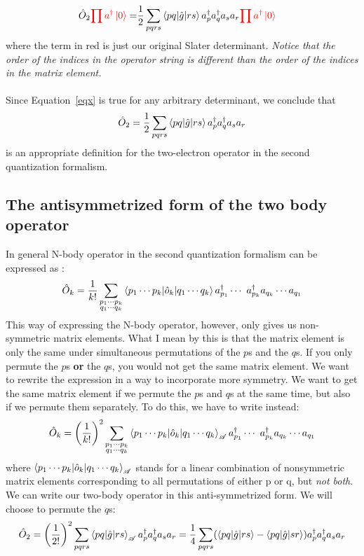 \documentclass{article}
\newcommand{\dg}{\ensuremath{^\dagger} }
\newcommand{\cd}{\ensuremath{\cdots} }
\begin{document}
\begin{align}
\hat{O}_2  {\color{red} \prod a\dg \ket{0} }= &\frac{1}{2}  \sum_{pqrs}  \braket{pq | \hat{g} | rs}  a\dg_{p}a\dg_{q} a_s a_r {\color{red} \prod a\dg \ket{0} } \label{eqx}
\end{align}
where the term in {\color{red} red} is just our original Slater determinant. \textit{Notice that the order of the indices in the operator string is different than the order of the indices in the matrix element. } \\ \\
Since Equation~\ref{eqx}  is true for any arbitrary determinant, we conclude that 
\begin{equation}
\hat{O}_2 =\frac{1}{2}  \sum_{pqrs}  \braket{pq | \hat{g} | rs}  a\dg_{p}a\dg_{q} a_s a_r
\end{equation}
is an appropriate definition for the two-electron operator in the second quantization formalism.
\\
\subsection{The antisymmetrized form of the two body operator}
In general N-body operator in the second quantization formalism can be expressed as :
\[ \hat{O}_k = \frac{1}{k!}   \sum_{\substack{p_1 \cd p_k \\q_1 \cd q_k }}  \braket{ p_1 \cd p_k | \hat{o}_k | q_1 \cd q_k} a_{p_1}\dg \cd \ a_{p_k}\dg a_{q_k} \cd a_{q_1} \]
This way of expressing the N-body operator, however, only gives us non-symmetric matrix elements. 
What I mean by this is that the matrix element is only the same under simultaneous permutations of the $p$s and the $q$s. 
If you only permute the $p$s \textbf{or} the $q$s, you would not get the same matrix element. 
We want to rewrite the expression in a way to incorporate more symmetry.
We want to get the same matrix element if we permute the $p$s and $q$s at the same time, but also if we permute them separately. 
To do this, we have to write instead: 
\[ \hat{O}_k = \left( \frac{1}{k!} \right)^2  \sum_{\substack{p_1 \cd p_k \\q_1 \cd q_k }}  \braket{ p_1 \cd p_k | \hat{o}_k | q_1 \cd q_k}_\mathscr{A} a_{p_1}\dg \cd \ a_{p_k}\dg a_{q_k} \cd a_{q_1} \]
where $\braket{ p_1 \cd p_k | \hat{o}_k | q_1 \cd q_k}_\mathscr{A}$ stands for a linear combination of nonsymmetric matrix elements corresponding to all permutations of either p or q, but \textit{not both}. 
We can write our two-body operator in this anti-symmetrized form. We will choose to permute the $q$s:
\[\hat{O}_2 =\left( \frac{1}{2!} \right)^2  \sum_{pqrs}  \braket{ pq | \hat{g} | rs}_\mathscr{A} a\dg_{p}a\dg_{q} a_s a_r = \frac{1}{4}\sum_{pqrs} ( \braket{ pq | \hat{g} | rs} -  \braket{ pq | \hat{g} | sr} )  a\dg_{p}a\dg_{q} a_s a_r  \]
\end{document}
